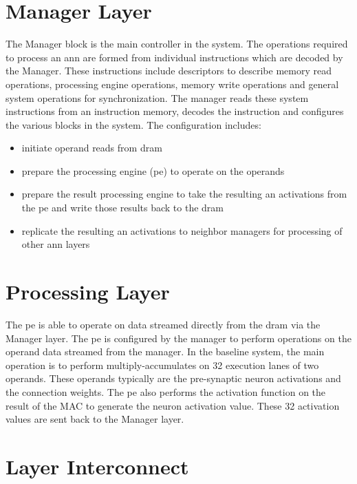 \section{Manager Layer}
The Manager block is the main controller in the system. The operations required to process an \ac{ann} are formed from individual instructions which are decoded by the Manager. 
These instructions include descriptors to describe memory read operations, processing engine operations, memory write operations and general system operations for synchronization. 
The manager reads these system instructions from an instruction memory, decodes the instruction and configures the various blocks in the system.
The configuration includes:
\begin{itemize}
      \item initiate operand reads from \ac{dram}
      \item prepare the processing engine (\ac{pe}) to operate on the operands
      \item prepare the result processing engine to take the resulting \ac{an} activations from the \ac{pe} and write those results back to the \ac{dram}
      \item replicate the resulting \ac{an} activations to neighbor managers for processing of other \ac{ann} layers
\end{itemize}

\section{Processing Layer}
\label{sec:Processing Layer}
The \ac{pe} is able to operate on data streamed directly from the \ac{dram} via the Manager layer. 
The \ac{pe} is configured by the manager to perform operations on the operand data streamed from the manager. 
In the baseline system, the main operation is to perform multiply-accumulates on 32 execution lanes of two operands. 
These operands typically are the pre-synaptic neuron activations and the connection weights. 
The \ac{pe} also performs the activation function on the result of the MAC to generate the neuron activation value. 
These 32 activation values are sent back to the Manager layer.

\section{Layer Interconnect}
\label{sec:Layer Interconnect}

